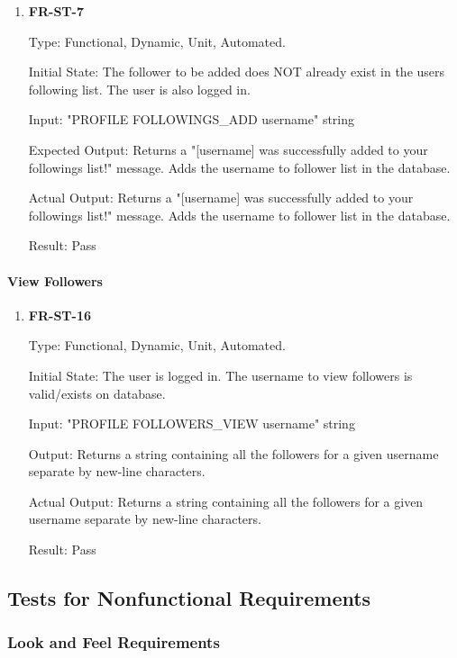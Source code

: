 \documentclass[12pt, titlepage]{article}
\begin{document}
\begin{enumerate}

\item{\textbf{FR-ST-7}}

Type: Functional, Dynamic, Unit, Automated.
					
Initial State: The follower to be added does NOT already exist in the users following list. The user is also logged in.
					
Input: "PROFILE FOLLOWINGS\_ADD username" string
					
Expected Output: Returns a "[username] was successfully added to your followings list!" message. Adds the username to follower list in the database.

Actual Output: Returns a "[username] was successfully added to your followings list!" message. Adds the username to follower list in the database.
					
Result: Pass
\end{enumerate}

\paragraph{View Followers}

\begin{enumerate}

\item{\textbf{FR-ST-16}}

Type: Functional, Dynamic, Unit, Automated.
					
Initial State: The user is logged in. The username to view followers is valid/exists on database.
					
Input: "PROFILE FOLLOWERS\_VIEW username" string
					
Output: Returns a string containing all the followers for a given username separate by new-line characters.


Actual Output: Returns a string containing all the followers for a given username separate by new-line characters.
					
Result: Pass
\end{enumerate}

\subsection{Tests for Nonfunctional Requirements}

\subsubsection{Look and Feel Requirements}
		
\end{document}
